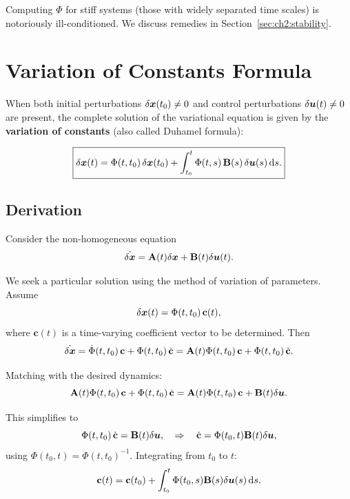 \begin{warningbox}
Computing $\Phi$ for stiff systems (those with widely separated time scales) is notoriously ill-conditioned.
We discuss remedies in Section~\ref{sec:ch2:stability}.
\end{warningbox}


\section{Variation of Constants Formula}

When both initial perturbations $\delta\bm{x}(t_0) \neq 0$ and control perturbations $\delta\bm{u}(t) \neq 0$ are present,
the complete solution of the variational equation is given by the \textbf{variation of constants} (also called
Duhamel formula):

\begin{equation}
\boxed{
\delta\bm{x}(t) = \Phi(t,t_0)\,\delta\bm{x}(t_0)
+ \int_{t_0}^{t} \Phi(t,s)\,\mathbf{B}(s)\,\delta\bm{u}(s)\,\mathrm{d} s.
}
\label{eq:ch2:duhamel}
\end{equation}

\subsection{Derivation}

Consider the non-homogeneous equation
\begin{equation}
\dot{\delta\bm{x}} = \mathbf{A}(t)\delta\bm{x} + \mathbf{B}(t)\delta\bm{u}(t).
\end{equation}

We seek a particular solution using the method of variation of parameters. Assume
\begin{equation}
\delta\bm{x}(t) = \Phi(t,t_0)\,\mathbf{c}(t),
\end{equation}
where $\mathbf{c}(t)$ is a time-varying coefficient vector to be determined. Then
\begin{equation}
\dot{\delta\bm{x}} = \dot{\Phi}(t,t_0)\,\mathbf{c} + \Phi(t,t_0)\,\dot{\mathbf{c}} = \mathbf{A}(t)\Phi(t,t_0)\,\mathbf{c} + \Phi(t,t_0)\,\dot{\mathbf{c}}.
\end{equation}

Matching with the desired dynamics:
\begin{equation}
\mathbf{A}(t)\Phi(t,t_0)\,\mathbf{c} + \Phi(t,t_0)\,\dot{\mathbf{c}} = \mathbf{A}(t)\Phi(t,t_0)\,\mathbf{c} + \mathbf{B}(t)\delta\bm{u}.
\end{equation}

This simplifies to
\begin{equation}
\Phi(t,t_0)\,\dot{\mathbf{c}} = \mathbf{B}(t)\delta\bm{u}, \quad \Rightarrow \quad \dot{\mathbf{c}} = \Phi(t_0,t)\mathbf{B}(t)\delta\bm{u},
\end{equation}
using $\Phi(t_0,t) = \Phi(t,t_0)^{-1}$. Integrating from $t_0$ to $t$:
\begin{equation}
\mathbf{c}(t) = \mathbf{c}(t_0) + \int_{t_0}^{t}\Phi(t_0,s)\mathbf{B}(s)\delta\bm{u}(s)\,\mathrm{d} s.
\end{equation}

